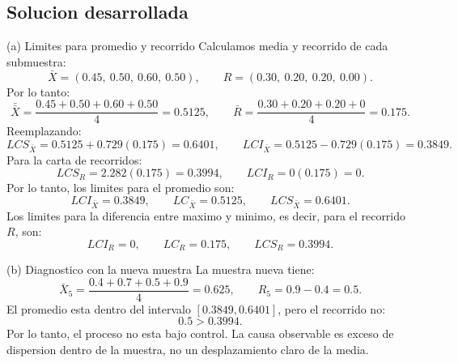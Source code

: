 \subsection{Solucion desarrollada}

\begin{respuesta}{(a) Limites para promedio y recorrido}
Calculamos media y recorrido de cada submuestra:
\[
\bar X=(0.45,\ 0.50,\ 0.60,\ 0.50),
\qquad
R=(0.30,\ 0.20,\ 0.20,\ 0.00).
\]
Por lo tanto:
\[
\bar{\bar X}=\frac{0.45+0.50+0.60+0.50}{4}=0.5125,
\qquad
\bar R=\frac{0.30+0.20+0.20+0}{4}=0.175.
\]
Reemplazando:
\[
LCS_{\bar X}=0.5125+0.729(0.175)=0.6401,
\qquad
LCI_{\bar X}=0.5125-0.729(0.175)=0.3849.
\]
Para la carta de recorridos:
\[
LCS_R=2.282(0.175)=0.3994,\qquad LCI_R=0(0.175)=0.
\]
Por lo tanto, los limites para el promedio son:
\[
\boxed{LCI_{\bar X}=0.3849},\qquad
\boxed{LC_{\bar X}=0.5125},\qquad
\boxed{LCS_{\bar X}=0.6401}.
\]
Los limites para la diferencia entre maximo y minimo, es decir, para el recorrido \(R\), son:
\[
\boxed{LCI_R=0},\qquad
\boxed{LC_R=0.175},\qquad
\boxed{LCS_R=0.3994}.
\]
\end{respuesta}

\begin{respuesta}{(b) Diagnostico con la nueva muestra}
La muestra nueva tiene:
\[
\bar X_5=\frac{0.4+0.7+0.5+0.9}{4}=0.625,
\qquad
R_5=0.9-0.4=0.5.
\]
El promedio esta dentro del intervalo \([0.3849,0.6401]\), pero el recorrido no:
\[
0.5>0.3994.
\]
Por lo tanto, el proceso no esta bajo control. La causa observable es exceso de dispersion dentro de la muestra, no un desplazamiento claro de la media.
\end{respuesta}

